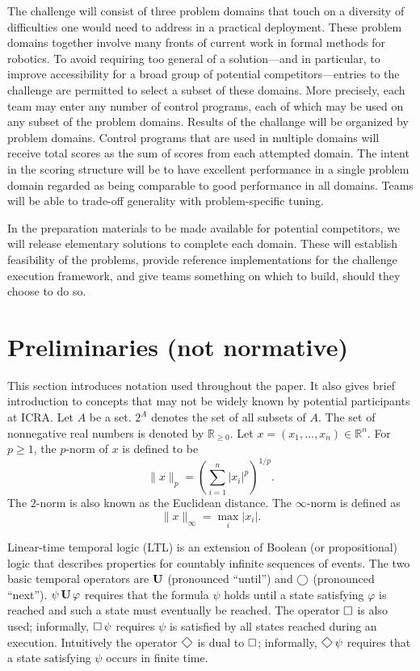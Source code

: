 \documentclass{amsart}
\theoremstyle{definition}
\begin{document}
The challenge will consist of three problem domains that touch on a diversity of
difficulties one would need to address in a practical deployment.  These problem
domains together involve many fronts of current work in formal methods for
robotics.  To avoid requiring too general of a solution---and in particular, to
improve accessibility for a broad group of potential competitors---entries to
the challenge are permitted to select a subset of these domains.  More
precisely, each team may enter any number of control programs, each of which may
be used on any subset of the problem domains.  Results of the challange will be
organized by problem domains.  Control programs that are used in multiple
domains will receive total scores as the sum of scores from each attempted
domain.  The intent in the scoring structure will be to have excellent
performance in a single problem domain regarded as being comparable to good
performance in all domains.  Teams will be able to trade-off generality with
problem-specific tuning.

In the preparation materials to be made available for potential competitors, we
will release elementary solutions to complete each domain.  These will establish
feasibility of the problems, provide reference implementations for the challenge
execution framework, and give teams something on which to build, should they
choose to do so.


\section{Preliminaries (not normative)}

This section introduces notation used throughout the paper.  It also gives brief
introduction to concepts that may not be widely known by potential participants
at ICRA.  Let $A$ be a set.  $2^A$ denotes the set of all subsets of $A$.  The
set of nonnegative real numbers is denoted by $\mathbb{R}_{\geq 0}$.  Let
$x=(x_1 , \ldots, x_n )\in \mathbb{R}^n$.  For $p \geq 1$, the $p$-norm of $x$
is defined to be
\begin{equation}
\lVert x \rVert_{p} = \left( \sum_{i=1}^{n}\lvert x_i \rvert^{p} \right)^{1/p} .
\end{equation}
The $2$-norm is also known as the Euclidean distance.  The $\infty$-norm is
defined as
\begin{equation}
\lVert x \rVert_{\infty} = \max_{i}\lvert x_i \rvert .
\end{equation}

Linear-time temporal logic (LTL) is an extension of Boolean (or propositional) logic
that describes properties for countably infinite sequences of events.  The two
basic temporal operators are $\operatorname{\mathbf{U}}$ (pronounced ``until'') and $\operatorname{\bigcirc}$
(pronounced ``next''). $\psi \operatorname{\mathbf{U}} \varphi$ requires that the formula $\psi$
holds until a state satisfying $\varphi$ is reached and such a state must
eventually be reached.  The operator $\operatorname{\Box}$ is also used; informally,
$\operatorname{\Box} \psi$ requires $\psi$ is satisfied by all states reached during an
execution.  Intuitively the operator $\Feventually$ is dual to $\operatorname{\Box}$;
informally, $\Feventually \psi$ requires that a state satisfying $\psi$ occurs
in finite time.
\end{document}
